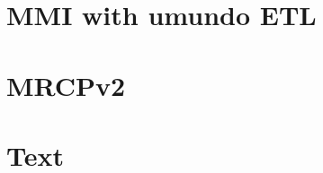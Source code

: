 \documentclass[11pt,a4paper]{book}
\begin{document}
\section{MMI with umundo ETL}


\section{MRCPv2}




\section{Text}




\end{document}
